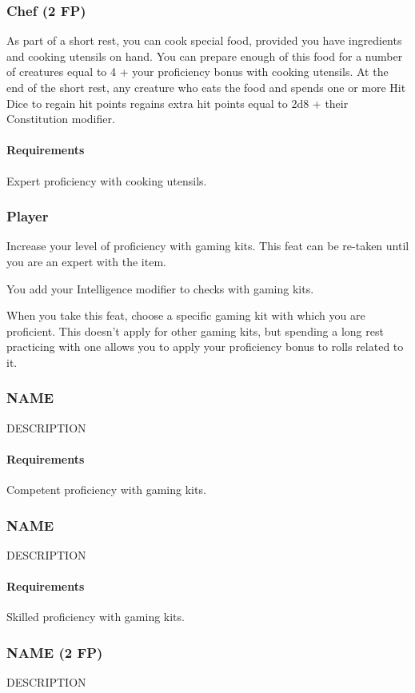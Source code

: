 \subsubsection{Chef (2 FP)} \label{feat::chef}
    As part of a short rest, you can cook special food, provided you have ingredients and cooking utensils on hand.
    You can prepare enough of this food for a number of creatures equal to 4 + your proficiency bonus with cooking utensils.
    At the end of the short rest, any creature who eats the food and spends one or more Hit Dice to regain hit points regains extra hit points equal to 2d8 + their Constitution modifier.
    \paragraph{Requirements} Expert proficiency with cooking utensils.

\subsubsection{Player} \label{feat::player}
    Increase your level of proficiency with gaming kits.
    This feat can be re-taken until you are an expert with the item.

    You add your Intelligence modifier to checks with gaming kits.

    When you take this feat, choose a specific gaming kit with which you are proficient.
    This doesn't apply for other gaming kits, but spending a long rest practicing with one allows you to apply your proficiency bonus to rolls related to it.
\subsubsection{NAME} \label{feat::name}
    DESCRIPTION
    \paragraph{Requirements} Competent proficiency with gaming kits.
\subsubsection{NAME} \label{feat::name}
    DESCRIPTION
    \paragraph{Requirements} Skilled proficiency with gaming kits.
\subsubsection{NAME (2 FP)} \label{feat::name}
    DESCRIPTION

